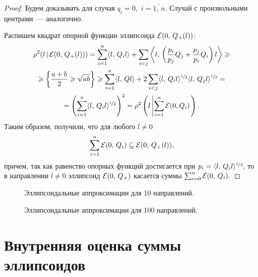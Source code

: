 \begin{proof}

Будем доказывать для случая $q_i = 0,$ $i = \overline{1,\,n}$. Случай с произвольными центрами~--- аналогично.

Распишем квадрат опорной функции эллипсоида $\mathcal{E}(0,\,Q_+(l))$:
\begin{multline*}
        \rho^2(l\,|\,\mathcal{E}(0,\,Q_+(l)))
        =
        \sum_{i=1}^{n}
        \langle
        l,\,Q_il
        \rangle
        +
        \sum_{i < j}
        \left\langle
l,\,\left(
\frac{p_i}{p_j}Q_j + \frac{p_j}{p_i}Q_i
\right)l
        \right\rangle
        \geqslant\\\geqslant
        \left\{
\frac{a+b}{2} \geqslant \sqrt{ab}
        \right\}
        \geqslant
        \sum_{i=1}^{n}\langle l,\,Ql \rangle
        +
        2\sum_{i < j}
        \langle l,\,Q_il \rangle^{\nicefrac12}
        \langle l,\,Q_jl \rangle^{\nicefrac12}
        =\\=
        \left(
\sum_{i=1}^n\langle l,\,Q_il\rangle^{\nicefrac12}
        \right)^2
        =
        \rho^2\left(
l\left|
        \sum_{i=1}^n\mathcal{E}(0, Q_i)
\right.
        \right).
\end{multline*}
Таким образом, получили, что для любого $l \neq 0$
$$
        \sum_{i=1}^n \mathcal{E}(0,\,Q_i) \subseteq \mathcal{E}(0,\,Q_+(l)),
$$
причем, так как равенство опорных функций достигается при
$
        p_i = \langle l,\,Q_i l \rangle^{\nicefrac12},
$
то в направлении $l \neq 0$ эллипсоид $\mathcal{E}(0,\,Q_+)$ касается суммы $\sum_{i = 0}^{n} \mathcal{E}(0,\,Q_i).$

\end{proof}

\clearpage
\begin{figure}[t]
        \centering
        
        \caption{Эллипсоидальные аппроксимации для 10 направлений.}
\end{figure}
\begin{figure}[b]
        \centering
        
        \caption{Эллипсоидальные аппроксимации для 100 направлений.}
\end{figure}

\clearpage
\section{Внутренняя оценка суммы эллипсоидов}

